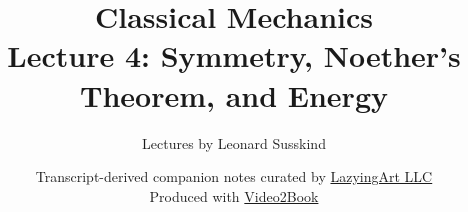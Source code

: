 \documentclass[11pt,oneside]{book}
\begin{document}
\hypersetup{pageanchor=false}
\frontmatter
\title{Classical Mechanics\\[0.45em]
\large Lecture 4: Symmetry, Noether's Theorem, and Energy}
\author{Lectures by Leonard Susskind}
\date{Transcript-derived companion notes curated by
\href{https://lazying.art}{LazyingArt LLC}\\[0.35em]
\small Produced with
\href{https://github.com/lachlanchen/Video2Book}{Video2Book}}
\maketitle
\hypersetup{pageanchor=true}
\mainmatter

\end{document}
